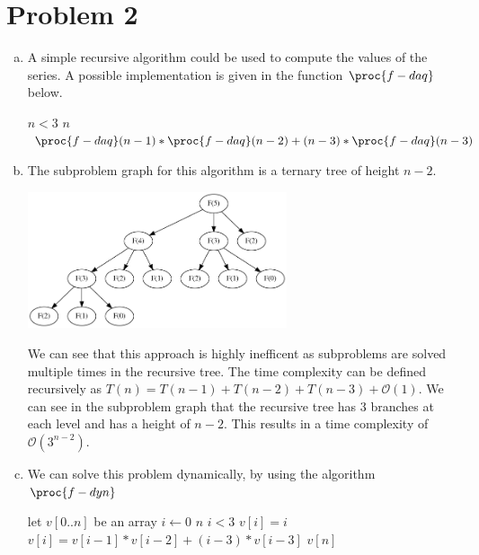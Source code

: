 \documentclass[a4paper, 10pt, twoside]{article}
\begin{document}
\section*{Problem 2}
\begin{enumerate}[a)]
	\item A simple recursive algorithm could be used to compute the values of the series. A possible implementation is given in the function $\proc{f-daq}$ below.

	      \begin{codebox}
		      \zi \If $n < 3$
		      \zi \Then \Return $n$ \End
		      \zi \Return $\proc{f-daq}(n-1) * \proc{f-daq}(n-2) + (n-3)*\proc{f-daq}(n-3)$ \End
	      \end{codebox}

	\item The subproblem graph for this algorithm is a ternary tree of height $n-2$.

	      \begin{center}
		      \includegraphics[width=0.6\textwidth]{fib_daq.png}
	      \end{center}

	      We can see that this approach is highly inefficent as subproblems are solved multiple times in the recursive tree. The time complexity can be defined recursively as $T(n) = T(n-1) + T(n-2) + T(n-3) + \mathcal{O}(1)$. We can see in the subproblem graph that the recursive tree has 3 branches at each level and has a height of $n-2$. This results in a time complexity of $\mathcal{O}(3^{n-2})$.

	\item We can solve this problem dynamically, by using the algorithm $\proc{f-dyn}$

	      \begin{codebox}
		      \Procname{$\proc{f-dyn}(n)$}
		      \zi let $v[0..n]$ be an array
		      \zi \For $i \gets 0$ \To $n$ \Do
		      \zi \If $i < 3$ \Do
		      \zi $v[i] = i$
		      \zi \Else
		      \zi $v[i] = v[i-1] * v[i-2] + (i-3) * v[i-3]$ \End \End
		      \zi \Return $v[n]$ \End
	      \end{codebox}


\end{enumerate}
\end{document}
